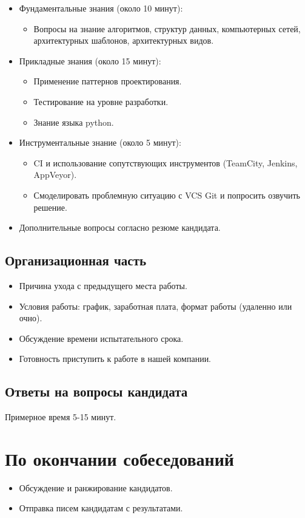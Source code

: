 \documentclass[a4paper,8pt]{article}
\begin{document}
\begin{itemize}
    \item Фундаментальные знания (около 10 минут):
        \begin{itemize}
            \item Вопросы на знание алгоритмов, структур данных, компьютерных сетей, архитектурных шаблонов, архитектурных видов.
        \end{itemize}
    \item Прикладные знания (около 15 минут):
        \begin{itemize}
            \item Применение паттернов проектирования.
            \item Тестирование на уровне разработки.
            \item Знание языка python.
        \end{itemize}
    \item Инструментальные знание (около 5 минут):
        \begin{itemize}
            \item CI и использование сопутствующих инструментов (TeamCity, Jenkins, AppVeyor).
            \item Смоделировать проблемную ситуацию с VCS Git и попросить озвучить решение.
        \end{itemize}
    \item Дополнительные вопросы согласно резюме кандидата.
\end{itemize}

\subsection*{Организационная часть}

\begin{itemize}
    \item Причина ухода с предыдущего места работы.
    \item Условия работы: график, заработная плата, формат работы (удаленно или очно).
    \item Обсуждение времени испытательного срока.
    \item Готовность приступить к работе в нашей компании.
\end{itemize}

\subsection*{Ответы на вопросы кандидата}

Примерное время 5-15 минут.

\section*{По окончании собеседований}

\begin{itemize}
    \item Обсуждение и ранжирование кандидатов.
    \item Отправка писем кандидатам с результатами.
\end{itemize}
\end{document}
